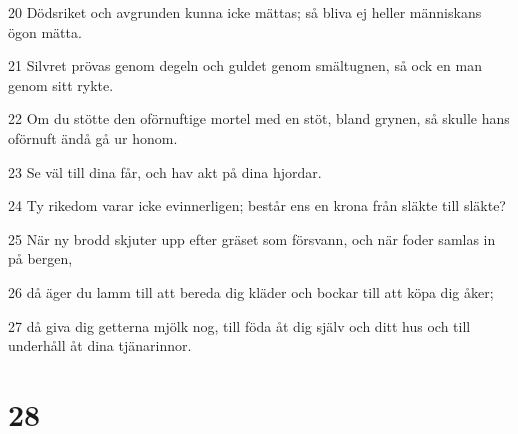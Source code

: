 \par 20 Dödsriket och avgrunden kunna icke mättas; så bliva ej heller människans ögon mätta.
\par 21 Silvret prövas genom degeln och guldet genom smältugnen, så ock en man genom sitt rykte.
\par 22 Om du stötte den oförnuftige mortel med en stöt, bland grynen, så skulle hans oförnuft ändå gå ur honom.
\par 23 Se väl till dina får, och hav akt på dina hjordar.
\par 24 Ty rikedom varar icke evinnerligen; består ens en krona från släkte till släkte?
\par 25 När ny brodd skjuter upp efter gräset som försvann, och när foder samlas in på bergen,
\par 26 då äger du lamm till att bereda dig kläder och bockar till att köpa dig åker;
\par 27 då giva dig getterna mjölk nog, till föda åt dig själv och ditt hus och till underhåll åt dina tjänarinnor.

\chapter{28}

